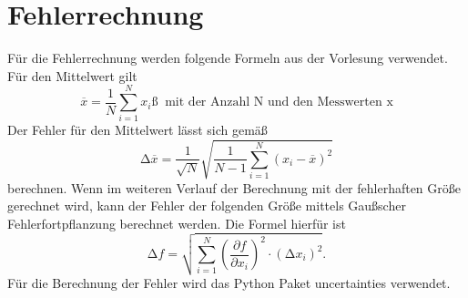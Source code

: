 \section{Fehlerrechnung}
\label{sec:Fehlerrechnung}
Für die Fehlerrechnung werden folgende Formeln aus der Vorlesung verwendet.
Für den Mittelwert gilt
\begin{equation}
    \overline{x}=\frac{1}{N}\sum_{i=1}^N x_i ß\; \;\text{mit der Anzahl N und den Messwerten x} 
    \label{eqn:Mittelwert}
\end{equation}
Der Fehler für den Mittelwert lässt sich gemäß
\begin{equation}
    \increment \overline{x}=\frac{1}{\sqrt{N}}\sqrt{\frac{1}{N-1}\sum_{i=1}^N(x_i-\overline{x})^2}
    \label{eqn:FehlerMittelwert}
\end{equation}
berechnen.
Wenn im weiteren Verlauf der Berechnung mit der fehlerhaften Größe gerechnet wird, kann der Fehler der folgenden Größe
mittels Gaußscher Fehlerfortpflanzung berechnet werden. Die Formel hierfür ist
\begin{equation}
    \increment f= \sqrt{\sum_{i=1}^N\left(\frac{\partial f}{\partial x_i}\right)^2\cdot(\increment x_i)^2}.
    \label{eqn:GaussMittelwert}
\end{equation}
Für die Berechnung der Fehler wird das Python Paket uncertainties verwendet.
